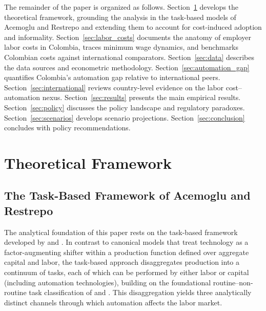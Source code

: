 \documentclass{article}
\begin{document}
The remainder of the paper is organized as follows. Section~\ref{sec:theory} develops the theoretical framework, grounding the analysis in the task-based models of Acemoglu and Restrepo and extending them to account for cost-induced adoption and informality. Section~\ref{sec:labor_costs} documents the anatomy of employer labor costs in Colombia, traces minimum wage dynamics, and benchmarks Colombian costs against international comparators. Section~\ref{sec:data} describes the data sources and econometric methodology. Section~\ref{sec:automation_gap} quantifies Colombia's automation gap relative to international peers. Section~\ref{sec:international} reviews country-level evidence on the labor cost--automation nexus. Section~\ref{sec:results} presents the main empirical results. Section~\ref{sec:policy} discusses the policy landscape and regulatory paradoxes. Section~\ref{sec:scenarios} develops scenario projections. Section~\ref{sec:conclusion} concludes with policy recommendations.

\FloatBarrier
\section{Theoretical Framework}
\label{sec:theory}

\subsection{The Task-Based Framework of Acemoglu and Restrepo}
\label{subsec:task_framework}

The analytical foundation of this paper rests on the task-based framework developed by \cite{acemoglu2019automation} and \cite{acemoglu2020robots}. In contrast to canonical models that treat technology as a factor-augmenting shifter within a production function defined over aggregate capital and labor, the task-based approach disaggregates production into a continuum of tasks, each of which can be performed by either labor or capital (including automation technologies), building on the foundational routine--non-routine task classification of \cite{autor2003} and \cite{levy2004}. This disaggregation yields three analytically distinct channels through which automation affects the labor market.
\end{document}

